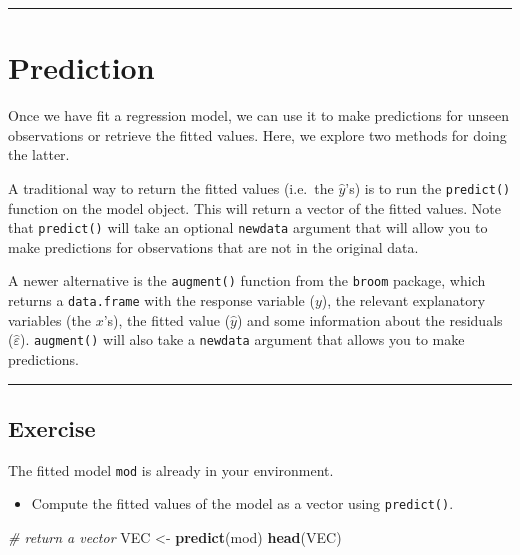 \documentclass[
]{book}
\newenvironment{Shaded}{\begin{snugshade}}{\end{snugshade}}
\newcommand{\CommentTok}[1]{\textcolor[rgb]{0.56,0.35,0.01}{\textit{#1}}}
\newcommand{\KeywordTok}[1]{\textcolor[rgb]{0.13,0.29,0.53}{\textbf{#1}}}
\newcommand{\NormalTok}[1]{#1}
\newcommand{\StringTok}[1]{\textcolor[rgb]{0.31,0.60,0.02}{#1}}
\providecommand{\tightlist}{%
  \setlength{\itemsep}{0pt}\setlength{\parskip}{0pt}}
\begin{document}
\begin{center}\rule{0.5\linewidth}{0.5pt}\end{center}

\hypertarget{prediction}{%
\section{Prediction}\label{prediction}}

Once we have fit a regression model, we can use it to make predictions for unseen observations or retrieve the fitted values. Here, we explore two methods for doing the latter.

A traditional way to return the fitted values (i.e.~the \(\hat{y}\)'s) is to run the \texttt{predict()} function on the model object. This will return a vector of the fitted values. Note that \texttt{predict()} will take an optional \texttt{newdata} argument that will allow you to make predictions for observations that are not in the original data.

A newer alternative is the \texttt{augment()} function from the \texttt{broom} package, which returns a \texttt{data.frame} with the response variable (\(y\)), the relevant explanatory variables (the \(x\)'s), the fitted value (\(\hat{y}\)) and some information about the residuals (\(\hat{\varepsilon}\)). \texttt{augment()} will also take a \texttt{newdata} argument that allows you to make predictions.

\begin{center}\rule{0.5\linewidth}{0.5pt}\end{center}

\hypertarget{exercise-5}{%
\subsection*{Exercise}\label{exercise-5}}

The fitted model \texttt{mod} is already in your environment.

\begin{itemize}
\tightlist
\item
  Compute the fitted values of the model as a vector using \texttt{predict()}.
\end{itemize}

\begin{Shaded}
\begin{Highlighting}[]
\CommentTok{# return a vector}
\NormalTok{VEC <-}\StringTok{ }\KeywordTok{predict}\NormalTok{(mod)}
\KeywordTok{head}\NormalTok{(VEC)}
\end{Highlighting}
\end{Shaded}
\end{document}
